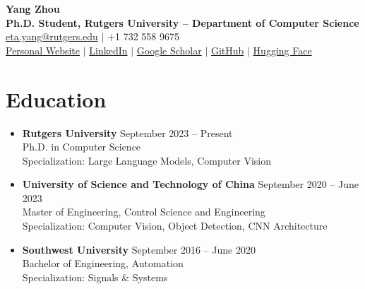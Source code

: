 \documentclass[a4paper,10pt]{article}
\begin{document}
\begin{center}
    {\Huge \textbf{Yang Zhou}} \\[4pt]
    \textbf{Ph.D. Student, Rutgers University -- Department of Computer Science} \\[4pt]
    \href{mailto:eta.yang@rutgers.edu}{eta.yang@rutgers.edu} $|$ +1 732 558 9675 \\[4pt]
    \href{https://etayang10th.github.io/}{Personal Website} $|$
    \href{https://www.linkedin.com/in/yang-zhou-0b6a78293/}{LinkedIn} $|$
    \href{https://scholar.google.com/citations?user=BsQ8IUcAAAAJ&hl=en}{Google Scholar} $|$
    \href{https://github.com/EtaYang10th}{GitHub} $|$
    \href{https://huggingface.co/EtaYang10th}{Hugging Face}
\end{center}


\section{Education}
\begin{itemize}[leftmargin=*, label={}]
    \item \textbf{Rutgers University} \hfill September 2023 -- Present \\
    Ph.D. in Computer Science \\
    Specialization: Large Language Models, Computer Vision

    \item \textbf{University of Science and Technology of China} \hfill September 2020 -- June 2023 \\
    Master of Engineering, Control Science and Engineering \\
    Specialization: Computer Vision, Object Detection, CNN Architecture

    \item \textbf{Southwest University} \hfill September 2016 -- June 2020 \\
    Bachelor of Engineering, Automation \\
    Specialization: Signals \& Systems
\end{itemize}
\end{document}

